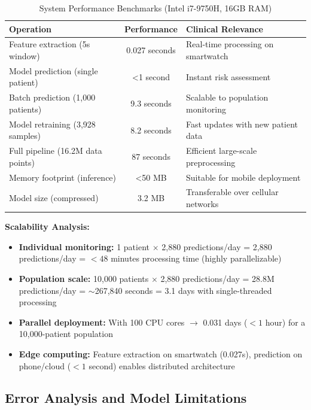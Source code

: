 \documentclass[3p,times,procedia]{elsarticle}
\begin{document}
\begin{table}[!ht]
\centering
\caption{System Performance Benchmarks (Intel i7-9750H, 16GB RAM)}
\small
\begin{tabular}{|l|c|l|}
\hline
\rowcolor{gray!20}
\textbf{Operation} & \textbf{Performance} & \textbf{Clinical Relevance} \\
\hline
Feature extraction (5s window) & 0.027 seconds & Real-time processing on smartwatch \\
\rowcolor{gray!10}
Model prediction (single patient) & \textless 1 second & Instant risk assessment \\
Batch prediction (1,000 patients) & 9.3 seconds & Scalable to population monitoring \\
\rowcolor{gray!10}
Model retraining (3,928 samples) & 8.2 seconds & Fast updates with new patient data \\
Full pipeline (16.2M data points) & 87 seconds & Efficient large-scale preprocessing \\
\rowcolor{gray!10}
Memory footprint (inference) & \textless 50 MB & Suitable for mobile deployment \\
Model size (compressed) & 3.2 MB & Transferable over cellular networks \\
\hline
\end{tabular}
\end{table}

\textbf{Scalability Analysis:}
\begin{itemize}
    \item \textbf{Individual monitoring:} 1 patient $\times$ 2,880 predictions/day = 2,880 predictions/day = $<48$ minutes processing time (highly parallelizable)

    \item \textbf{Population scale:} 10,000 patients $\times$ 2,880 predictions/day = 28.8M predictions/day = $\sim$267,840 seconds = 3.1 days with single-threaded processing

    \item \textbf{Parallel deployment:} With 100 CPU cores $\rightarrow$ 0.031 days ($<1$ hour) for a 10,000-patient population

    \item \textbf{Edge computing:} Feature extraction on smartwatch (0.027s), prediction on phone/cloud ($<1$ second) enables distributed architecture
\end{itemize}

\subsection{Error Analysis and Model Limitations}
\end{document}
